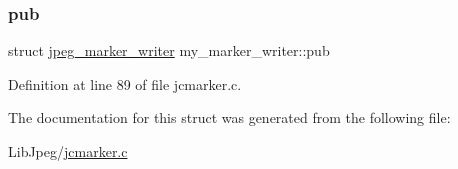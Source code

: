 \mbox{\label{structmy__marker__writer_a4b02f71e32586520f4498e51a79b1fca}} 
\subsubsection{\texorpdfstring{pub}{pub}}
{\footnotesize\ttfamily struct \mbox{\hyperlink{structjpeg__marker__writer}{jpeg\+\_\+marker\+\_\+writer}} my\+\_\+marker\+\_\+writer\+::pub}



Definition at line 89 of file jcmarker.\+c.



The documentation for this struct was generated from the following file\+:\begin{DoxyCompactItemize}
\item 
Lib\+Jpeg/\mbox{\hyperlink{jcmarker_8c}{jcmarker.\+c}}\end{DoxyCompactItemize}
